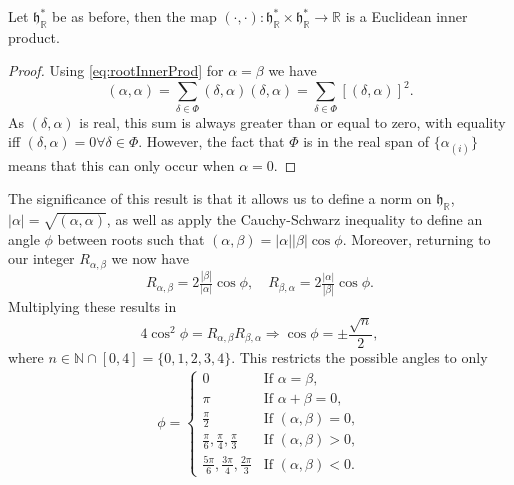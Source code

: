 \documentclass[11pt,fleqn]{article}
\renewenvironment{prop}{\begin{pBox}\begin{propT}}{\end{propT}\end{pBox}}
\begin{document}
\begin{prop}\label{prop:realRootGeometry}
	Let $\mathfrak{h}^*_\mathbb{R}$ be as before, then the map $(\cdot,\cdot): \mathfrak{h}^*_\mathbb{R} \times \mathfrak{h}^*_\mathbb{R} \to \mathbb{R}$ is a Euclidean inner product.
\end{prop}
\begin{proof}
	Using \eqref{eq:rootInnerProd} for $\alpha = \beta$ we have
		\begin{equation}
			(\alpha, \alpha) = \sum_{\delta \in \Phi} (\delta, \alpha) (\delta,\alpha) = \sum_{\delta \in \Phi} \left[ (\delta, \alpha) \right]^2.
		\end{equation}
	As $(\delta,\alpha)$ is real, this sum is always greater than or equal to zero, with equality iff $(\delta,\alpha) = 0 \forall \delta \in \Phi$. However, the fact that $\Phi$ is in the real span of $\{ \alpha_{(i)} \}$ means that this can only occur when $\alpha = 0$.
\end{proof}
\begin{remark}
	The significance of this result is that it allows us to define a norm on $\mathfrak{h}_\mathbb{R}$, $|\alpha| = \sqrt{(\alpha,\alpha)}$, as well as apply the Cauchy-Schwarz inequality to define an angle $\phi$ between roots such that $(\alpha,\beta) = |\alpha| |\beta| \cos \phi$. Moreover, returning to our integer $R_{\alpha, \beta}$ we now have
		\begin{equation}\label{eq:rootAngle1}
			R_{\alpha,\beta} = 2 \tfrac{|\beta|}{|\alpha|}\cos \phi, \quad R_{\beta, \alpha} = 2 \tfrac{|\alpha|}{|\beta|} \cos \phi.
		\end{equation}
	Multiplying these results in
		\begin{equation}\label{eq:rootAngle2}
			4 \cos^2 \phi = R_{\alpha,\beta} R_{\beta,\alpha} \Rightarrow \cos \phi = \pm \frac{\sqrt{n}}{2},
		\end{equation}
	where $n \in \mathbb{N} \cap [0,4] = \{0,1,2,3,4\}$. This restricts the possible angles to only
		\begin{align}
			\phi = \begin{cases}
				0 &\text{If } \alpha = \beta,\\
				\pi &\text{If } \alpha + \beta = 0,\\
				\tfrac{\pi}{2} &\text{If } (\alpha,\beta) = 0,\\
				\tfrac{\pi}{6}, \tfrac{\pi}{4}, \tfrac{\pi}{3} &\text{If } (\alpha,\beta) > 0,\\
				\tfrac{5\pi}{6}, \tfrac{3\pi}{4}, \tfrac{2\pi}{3} &\text{If } (\alpha, \beta) <0.
			\end{cases}
		\end{align}
\end{remark}
\end{document}
